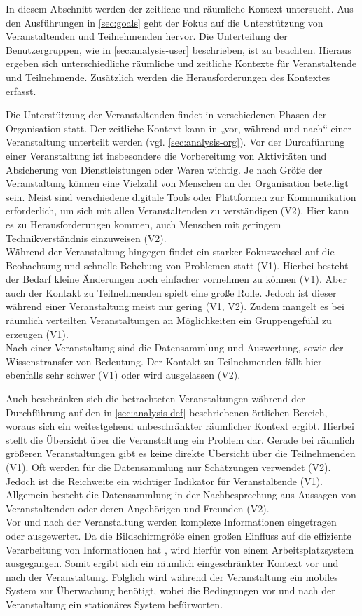 In diesem Abschnitt werden der zeitliche und räumliche Kontext untersucht. Aus
den Ausführungen in \autoref{sec:goals} geht der Fokus auf die Unterstützung von
Veranstaltenden und Teilnehmenden hervor. Die Unterteilung der Benutzergruppen,
wie in \autoref{sec:analysis-user} beschrieben, ist zu beachten. Hieraus ergeben
sich unterschiedliche räumliche und zeitliche Kontexte für Veranstaltende und
Teilnehmende. Zusätzlich werden die Herausforderungen des Kontextes erfasst.

Die Unterstützung der Veranstaltenden findet in verschiedenen Phasen der
Organisation statt. Der zeitliche Kontext kann in „vor, während und nach“ einer
Veranstaltung unterteilt werden (vgl. \autoref{sec:analysis-org}). Vor der
Durchführung einer Veranstaltung ist insbesondere die Vorbereitung von
Aktivitäten und Absicherung von Dienstleistungen oder Waren wichtig. Je nach
Größe der Veranstaltung können eine Vielzahl von Menschen an der Organisation
beteiligt sein. Meist sind verschiedene digitale Tools oder Plattformen zur
Kommunikation erforderlich, um sich mit allen Veranstaltenden zu verständigen
(V2). Hier kann es zu Herausforderungen kommen, auch Menschen mit geringem
Technikverständnis einzuweisen (V2). \\
Während der Veranstaltung hingegen findet ein starker Fokuswechsel auf die
Beobachtung und schnelle Behebung von Problemen statt (V1). Hierbei besteht der
Bedarf kleine Änderungen noch einfacher vornehmen zu können (V1). Aber auch der
Kontakt zu Teilnehmenden spielt eine große Rolle. Jedoch ist dieser während
einer Veranstaltung meist nur gering (V1, V2). Zudem mangelt es bei räumlich
verteilten Veranstaltungen an Möglichkeiten ein Gruppengefühl zu erzeugen (V1).
\\
Nach einer Veranstaltung sind die Datensammlung und Auswertung, sowie der
Wissenstransfer von Bedeutung. Der Kontakt zu Teilnehmenden fällt hier ebenfalls
sehr schwer (V1) oder wird ausgelassen (V2).

Auch beschränken sich die betrachteten Veranstaltungen während der Durchführung
auf den in \autoref{sec:analysis-def} beschriebenen örtlichen Bereich, woraus
sich ein weitestgehend unbeschränkter räumlicher Kontext ergibt. Hierbei stellt
die Übersicht über die Veranstaltung ein Problem dar. Gerade bei räumlich
größeren Veranstaltungen gibt es keine direkte Übersicht über die Teilnehmenden
(V1). Oft werden für die Datensammlung nur Schätzungen verwendet (V2). Jedoch
ist die Reichweite ein wichtiger Indikator für Veranstaltende (V1). Allgemein
besteht die Datensammlung in der Nachbesprechung aus Aussagen von
Veranstaltenden oder deren Angehörigen und Freunden (V2). \\
Vor und nach der Veranstaltung werden komplexe Informationen eingetragen oder
ausgewertet. Da die Bildschirmgröße einen großen Einfluss auf die effiziente
Verarbeitung von Informationen hat \cite{Ni2006}, wird hierfür von einem
Arbeitsplatzsystem ausgegangen. Somit ergibt sich ein räumlich eingeschränkter
Kontext vor und nach der Veranstaltung. Folglich wird während der Veranstaltung
ein mobiles System zur Überwachung benötigt, wobei die Bedingungen vor und nach
der Veranstaltung ein stationäres System befürworten.

